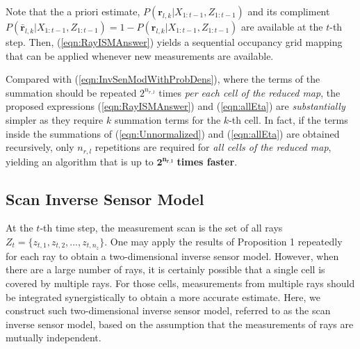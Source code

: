 \documentclass[letterpaper, 10pt, conference]{ieeeconf}
\newcommand{\refeqn}[1]{(\ref{eqn:#1})}
\begin{document}
Note that the a priori estimate, $P(\mathbf{r}_{l,k}|X_{1:t-1},Z_{1:t-1})$ and its compliment $P(\bar{\mathbf{r}}_{l,k}|X_{1:t-1},Z_{1:t-1})=1-P(\mathbf{r}_{l,k}|X_{1:t-1},Z_{1:t-1})$ are available at the $t$-th step. Then, \refeqn{RayISMAnswer} yields a sequential occupancy grid mapping that can be applied whenever new measurements are available. 

Compared with \refeqn{InvSenModWithProbDens}, where the terms of the summation should be repeated $2^{n_{r,l}}$ times \emph{per each cell of the reduced map}, the proposed expressions \refeqn{RayISMAnswer} and \refeqn{allEta} are \textit{substantially} simpler as they require $k$ summation terms for the $k$-th cell. In fact, if the terms inside the summations of \refeqn{Unnormalized} and \refeqn{allEta} are obtained recursively, only $n_{r,l}$ repetitions are required for \emph{all cells of the reduced map}, yielding an algorithm that is up to $\mathbf{2^{n_{r,l}}}$ \textbf{times faster}.

\subsection{Scan Inverse Sensor Model}


At the $t$-th time step, the measurement scan is the set of all rays $Z_t=\{z_{t,1},z_{t,2},...,z_{t,n_z}\}$. One may apply the results of Proposition 1 repeatedly for each ray to obtain a two-dimensional inverse sensor model. However, when there are a large number of rays, it is certainly possible that a single cell is covered by multiple rays. For those cells, measurements from multiple rays should be integrated synergistically to obtain a more accurate estimate. Here, we construct such two-dimensional inverse sensor model, referred to as the scan inverse sensor model, based on the assumption that the measurements of rays are mutually independent.


\end{document}
